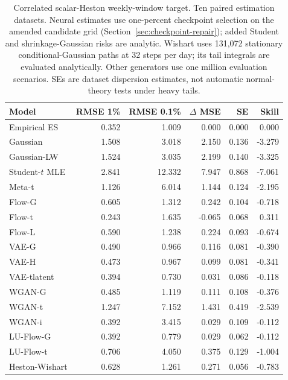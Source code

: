 \documentclass[11pt]{article}
\theoremstyle{definition}\newtheorem{definition}[theorem]{Definition}
\theoremstyle{remark}\newtheorem{remark}[theorem]{Remark}
\begin{document}
\begin{table}[htbp]
\centering\footnotesize
\setlength{\tabcolsep}{4pt}
\begin{tabular}{lrrrrr}
\toprule
Model & RMSE 1\% & RMSE 0.1\% & $\Delta$ MSE & SE & Skill \\
\midrule
Empirical ES & 0.352 & 1.009 & 0.000 & 0.000 & 0.000 \\
Gaussian & 1.508 & 3.018 & 2.150 & 0.136 & -3.279 \\
Gaussian-LW & 1.524 & 3.035 & 2.199 & 0.140 & -3.325 \\
Student-$t$ MLE & 2.841 & 12.332 & 7.947 & 0.868 & -7.061 \\
Meta-t & 1.126 & 6.014 & 1.144 & 0.124 & -2.195 \\
Flow-G & 0.605 & 1.312 & 0.242 & 0.104 & -0.718 \\
Flow-t & 0.243 & 1.635 & -0.065 & 0.068 & 0.311 \\
Flow-L & 0.590 & 1.238 & 0.224 & 0.093 & -0.674 \\
VAE-G & 0.490 & 0.966 & 0.116 & 0.081 & -0.390 \\
VAE-H & 0.473 & 0.967 & 0.099 & 0.081 & -0.341 \\
VAE-tlatent & 0.394 & 0.730 & 0.031 & 0.086 & -0.118 \\
WGAN-G & 0.485 & 1.119 & 0.111 & 0.108 & -0.376 \\
WGAN-t & 1.247 & 7.152 & 1.431 & 0.419 & -2.539 \\
WGAN-i & 0.392 & 3.415 & 0.029 & 0.109 & -0.112 \\
LU-Flow-G & 0.392 & 0.779 & 0.029 & 0.062 & -0.112 \\
LU-Flow-t & 0.706 & 4.050 & 0.375 & 0.129 & -1.004 \\
Heston-Wishart & 0.628 & 1.261 & 0.271 & 0.056 & -0.783 \\
\bottomrule
\end{tabular}
\caption{Correlated scalar-Heston weekly-window target. Ten paired estimation datasets. Neural estimates use one-percent checkpoint selection on the amended candidate grid (Section~\ref{sec:checkpoint-repair}); added Student and shrinkage-Gaussian risks are analytic. Wishart uses 131,072 stationary conditional-Gaussian paths at 32 steps per day; its tail integrals are evaluated analytically. Other generators use one million evaluation scenarios. SEs are dataset dispersion estimates, not automatic normal-theory tests under heavy tails.}\label{tab:r4-syn-heston}
\end{table}
\end{document}
